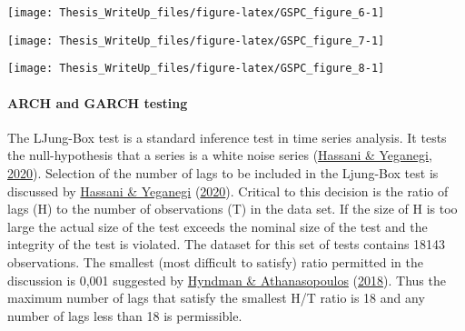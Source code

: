 \documentclass[11pt,preprint, authoryear]{elsarticle}
\let\origfigure\figure
\let\endorigfigure\endfigure
\renewenvironment{figure}[1][2] {
    \expandafter\origfigure\expandafter[H]
} {
    \endorigfigure
}
\numberwithin{equation}{section}
\numberwithin{figure}{section}
\numberwithin{table}{section}
\begin{document}
\begin{figure}[H]

{\centering \texttt{[image: Thesis\_WriteUp\_files/figure-latex/GSPC\_figure\_6-1]} 

}

\caption{Absolute logDiff and stdVol \label{Figure6}}\label{fig:GSPC_figure_6}
\end{figure}

\begin{figure}[H]

{\centering \texttt{[image: Thesis\_WriteUp\_files/figure-latex/GSPC\_figure\_7-1]} 

}

\caption{DateResid of StdVol (Red) and stdVol (Green) \label{Figure7}}\label{fig:GSPC_figure_7}
\end{figure}

\begin{figure}[H]

{\centering \texttt{[image: Thesis\_WriteUp\_files/figure-latex/GSPC\_figure\_8-1]} 

}

\caption{stdVolControlled and absolute LogDiff \label{Figure8}}\label{fig:GSPC_figure_8}
\end{figure}

\hypertarget{arch-and-garch-testing}{%
\paragraph{\texorpdfstring{ARCH and GARCH testing
\label{ARCHandGARCH}}{ARCH and GARCH testing }}\label{arch-and-garch-testing}}

The LJung-Box test is a standard inference test in time series analysis.
It tests the null-hypothesis that a series is a white noise series
(\protect\hyperlink{ref-hassani2020selecting}{Hassani \& Yeganegi,
2020}). Selection of the number of lags to be included in the Ljung-Box
test is discussed by
\protect\hyperlink{ref-hassani2020selecting}{Hassani \& Yeganegi}
(\protect\hyperlink{ref-hassani2020selecting}{2020}). Critical to this
decision is the ratio of lags (H) to the number of observations (T) in
the data set. If the size of H is too large the actual size of the test
exceeds the nominal size of the test and the integrity of the test is
violated. The dataset for this set of tests contains 18143 observations.
The smallest (most difficult to satisfy) ratio permitted in the
discussion is 0,001 suggested by
\protect\hyperlink{ref-hyndman2018forecasting}{Hyndman \&
Athanasopoulos} (\protect\hyperlink{ref-hyndman2018forecasting}{2018}).
Thus the maximum number of lags that satisfy the smallest H/T ratio is
18 and any number of lags less than 18 is permissible.
\end{document}
